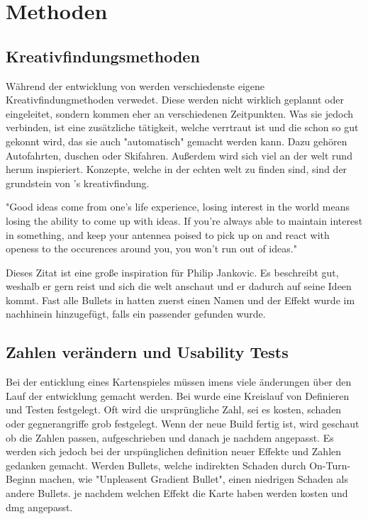 
\section{Methoden}\label{sec:methoden}

\renewcommand{\kapitelautor}{Autor: Philip Jankovic}

%

\subsection{Kreativfindungsmethoden}\label{subsec:kreativfindungsmethoden}

Während der entwicklung von \FF werden verschiedenste eigene Kreativfindungmethoden verwedet. Diese werden nicht wirklich
geplannt oder eingeleitet, sondern kommen eher an verschiedenen Zeitpunkten. Was sie jedoch verbinden, ist eine zusätzliche
tätigkeit, welche verrtraut ist und die schon so gut gekonnt wird, das sie auch "automatisch" gemacht werden kann.
Dazu gehören \zB Autofahrten, duschen oder Skifahren. Außerdem wird sich viel an der welt rund herum inspieriert.
Konzepte, welche in der echten welt zu finden sind, sind der grundstein von \FF's kreativfindung.

"Good ideas come from one's life experience, losing interest in the world means losing the ability to come up with ideas.
If you're always able to maintain interest in something, and keep your antennea poised to pick up on and react with openess
to the occurences around you, you won't run out of ideas."%


Dieses Zitat ist eine große inspiration für Philip Jankovic. Es beschreibt gut, weshalb er gern reist und sich die welt
anschaut und er dadurch auf seine Ideen kommt. Fast alle Bullets in \FF hatten zuerst einen Namen und der Effekt wurde
im nachhinein hinzugefügt, falls ein passender gefunden wurde.


\subsection{Zahlen verändern und Usability Tests}\label{subsec:usability}

Bei der enticklung eines Kartenspieles müssen imens viele änderungen über den Lauf der entwicklung gemacht werden.
Bei \FF wurde eine Kreislauf von Definieren und Testen festgelegt. Oft wird die ursprüngliche Zahl, sei es kosten,
schaden oder gegnerangriffe grob festgelegt. Wenn der neue Build fertig ist, wird geschaut ob die Zahlen passen, aufgeschrieben und danach
je nachdem angepasst. Es werden sich jedoch bei der urspünglichen definition neuer Effekte und Zahlen gedanken gemacht.
\zB Werden Bullets, welche indirekten Schaden durch \zB On-Turn-Beginn machen, wie "Unpleasent Gradient Bullet", einen niedrigen Schaden als andere Bullets.
je nachdem welchen Effekt die Karte haben werden kosten und dmg angepasst.




%

\renewcommand{\kapitelautor}{}
